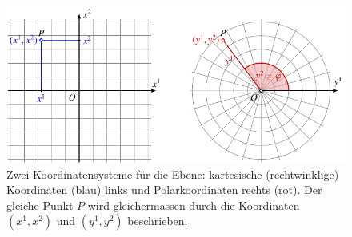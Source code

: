 %
%
%
\begin{figure}
\centering
\includegraphics{chapters/020-koordinaten/images/kartpolar.pdf}
\caption{Zwei Koordinatensysteme für die Ebene:
kartesische (rechtwinklige) Koordinaten (blau) links und Polarkoordinaten
rechts (rot).
Der gleiche Punkt $P$ wird gleichermassen durch die Koordinaten 
$(x^1,x^2)$ und $(y^1,y^2)$ beschrieben.
\label{buch:koordinaten:fig:kartpolar}}
\end{figure}
